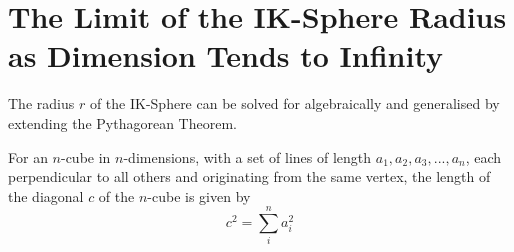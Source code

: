 \section{The Limit of the IK-Sphere Radius as Dimension Tends to Infinity}
The radius $r$ of the IK-Sphere can be solved for algebraically and generalised by extending the Pythagorean Theorem.
\begin{lemma}\label{lemma:extend pythag}
    For an $n$-cube in $n$-dimensions, with a set of lines of length $a_1, a_2, a_3, ... , a_n$, each perpendicular to all others and originating from the same vertex, the length of the diagonal $c$ of the $n$-cube is given by
    \begin{equation}\label{extendedpythag}
        c^2 = \sum_{i}^{n}a_i^2
    \end{equation}
\end{lemma}
